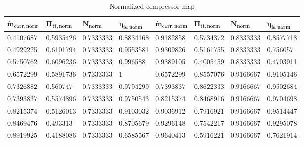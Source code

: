 \begin{longtable}[c]{@{}llll|llll@{}}
\caption{Normalized compressor map}
\label{tab:C7_compmap}\\
\toprule
$\mathbf{\dot{m}_{corr,norm}}$ & $\mathbf{\Pi_{tt,norm}}$ & $\mathbf{N_{norm}}$ & $\mathbf{\eta_{is,norm}}$ & $\mathbf{\dot{m}_{corr,norm}}$ & $\mathbf{\Pi_{tt,norm}}$ & $\mathbf{N_{norm}}$ & $\mathbf{\eta_{is,norm}}$ \\* \midrule
\endfirsthead
%
\endhead
%
\bottomrule
\endfoot
%
\endlastfoot
%
0.4107687                   & 0.5935426                & 0.7333333            & 0.8834168                 & 0.9182858                   & 0.5734372                & 0.8333333            & 0.8577718                 \\
0.4929225                   & 0.6101794                & 0.7333333            & 0.9553581                 & 0.9309826                   & 0.5161755                & 0.8333333            & 0.756057                  \\
0.5750762                   & 0.6096236                & 0.7333333            & 0.996588                  & 0.9389105                   & 0.4005459                & 0.8333333            & 0.4703911                 \\
0.6572299                   & 0.5891736                & 0.7333333            & 1                         & 0.6572299                   & 0.8557076                & 0.9166667            & 0.9105146                 \\
0.7326882                   & 0.560747                 & 0.7333333            & 0.9794299                 & 0.7393837                   & 0.8622333                & 0.9166667            & 0.9502684                 \\
0.7393837                   & 0.5574896                & 0.7333333            & 0.9750543                 & 0.8215374                   & 0.8468916                & 0.9166667            & 0.9704698                 \\
0.8215374                   & 0.5126013                & 0.7333333            & 0.9103032                 & 0.9036912                   & 0.7916921                & 0.9166667            & 0.9514447                 \\
0.8469476                   & 0.493313                 & 0.7333333            & 0.8705679                 & 0.9296148                   & 0.7542217                & 0.9166667            & 0.9295078                 \\
0.8919925                   & 0.4188086                & 0.7333333            & 0.6585567                 & 0.9640413                   & 0.5916221                & 0.9166667            & 0.7621914                 \\

\end{longtable}
